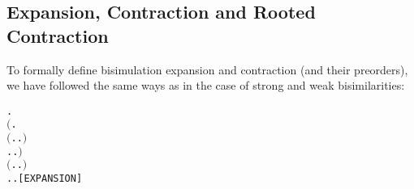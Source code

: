 \subsection{Expansion, Contraction and Rooted Contraction}

To formally define bisimulation expansion and contraction (and their preorders), we have
followed the same ways as in the case of strong and weak bisimilarities:
\begin{alltt}
  \HOLSymConst{\HOLTokenDefEquality{}}
  \HOLSymConst{\HOLTokenForall{}} .
         \HOLSymConst{\HOLTokenImp{}}
      \ensuremath{(}\HOLSymConst{\HOLTokenForall{}}.
           \ensuremath{(}\HOLSymConst{\HOLTokenForall{}}.  \HOLTokenTransBegin{} \HOLTokenTransEnd {} \HOLSymConst{\HOLTokenImp{}} \HOLSymConst{\HOLTokenExists{}}.  \HOLTokenTransBegin{} \HOLTokenTransEnd {} \HOLSymConst{\HOLTokenConj{}}   \ensuremath{)} \HOLSymConst{\HOLTokenConj{}}
           \HOLSymConst{\HOLTokenForall{}}.  \HOLTokenTransBegin{} \HOLTokenTransEnd {} \HOLSymConst{\HOLTokenImp{}} \HOLSymConst{\HOLTokenExists{}}.  \HOLTokenWeakTransBegin{} \HOLTokenWeakTransEnd {} \HOLSymConst{\HOLTokenConj{}}   \ensuremath{)} \HOLSymConst{\HOLTokenConj{}}
      \ensuremath{(}\HOLSymConst{\HOLTokenForall{}}.  \HOLTokenTransBegin\HOLSymConst{\ensuremath{\tau}}\HOLTokenTransEnd {} \HOLSymConst{\HOLTokenImp{}}    \HOLSymConst{\HOLTokenDisj{}} \HOLSymConst{\HOLTokenExists{}}.  \HOLTokenTransBegin\HOLSymConst{\ensuremath{\tau}}\HOLTokenTransEnd {} \HOLSymConst{\HOLTokenConj{}}   \ensuremath{)} \HOLSymConst{\HOLTokenConj{}}
      \HOLSymConst{\HOLTokenForall{}}.  \HOLTokenTransBegin\HOLSymConst{\ensuremath{\tau}}\HOLTokenTransEnd {} \HOLSymConst{\HOLTokenImp{}} \HOLSymConst{\HOLTokenExists{}}.  \HOLTokenWeakTransBegin\HOLSymConst{\ensuremath{\tau}}\HOLTokenWeakTransEnd {} \HOLSymConst{\HOLTokenConj{}}   \hfill{[EXPANSION]}


\end{alltt}
